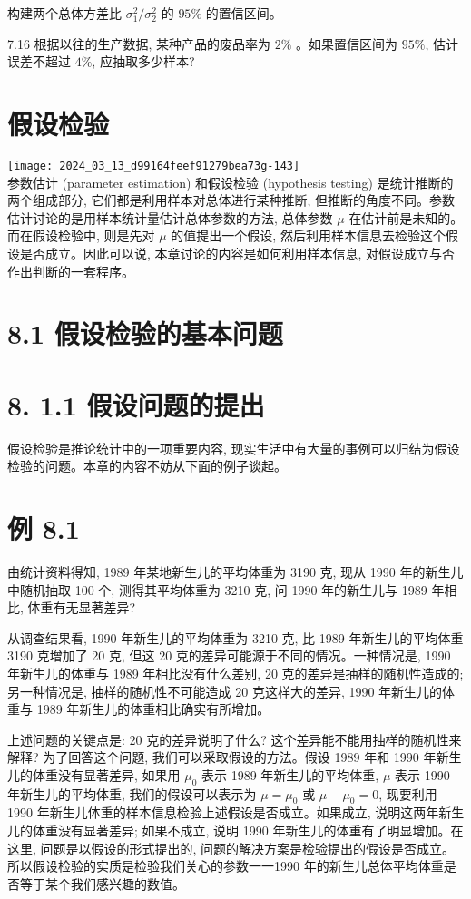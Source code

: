 \documentclass[10pt]{article}
\begin{document}
\begin{CJK*}{UTF8}{bsmi}
构建两个总体方差比 $\sigma_{1}^{2} / \sigma_{2}^{2}$ 的 $95 \%$ 的置信区间。

7.16 根据以往的生产数据, 某种产品的废品率为 $2 \%$ 。如果置信区间为 $95 \%$, 估计误差不超过 $4 \%$, 应抽取多少样本?

\section*{假设检验}
\texttt{[image: 2024\_03\_13\_d99164feef91279bea73g-143]}\\
参数估计 (parameter estimation) 和假设检验 (hypothesis testing) 是统计推断的两个组成部分, 它们都是利用样本对总体进行某种推断, 但推断的角度不同。参数估计讨论的是用样本统计量估计总体参数的方法, 总体参数 $\mu$ 在估计前是未知的。而在假设检验中, 则是先对 $\mu$ 的值提出一个假设, 然后利用样本信息去检验这个假设是否成立。因此可以说, 本章讨论的内容是如何利用样本信息, 对假设成立与否作出判断的一套程序。

\section*{8.1 假设检验的基本问题}
\section*{8. 1.1 假设问题的提出}
假设检验是推论统计中的一项重要内容, 现实生活中有大量的事例可以归结为假设检验的问题。本章的内容不妨从下面的例子谈起。

\section*{例 8.1}
由统计资料得知, 1989 年某地新生儿的平均体重为 3190 克, 现从 1990 年的新生儿中随机抽取 100 个, 测得其平均体重为 3210 克, 问 1990 年的新生儿与 1989 年相比, 体重有无显著差异?

从调查结果看, 1990 年新生儿的平均体重为 3210 克, 比 1989 年新生儿的平均体重 3190 克增加了 20 克, 但这 20 克的差异可能源于不同的情况。一种情况是, 1990 年新生儿的体重与 1989 年相比没有什么差别, 20 克的差异是抽样的随机性造成的; 另一种情况是, 抽样的随机性不可能造成 20 克这样大的差异, 1990 年新生儿的体重与 1989 年新生儿的体重相比确实有所增加。

上述问题的关键点是: 20 克的差异说明了什么? 这个差异能不能用抽样的随机性来解释? 为了回答这个问题, 我们可以采取假设的方法。假设 1989 年和 1990 年新生儿的体重没有显著差异, 如果用 $\mu_{0}$ 表示 1989 年新生儿的平均体重, $\mu$ 表示 1990 年新生儿的平均体重, 我们的假设可以表示为 $\mu=\mu_{0}$ 或 $\mu-\mu_{0}=0$, 现要利用 1990 年新生儿体重的样本信息检验上述假设是否成立。如果成立, 说明这两年新生儿的体重没有显著差异; 如果不成立, 说明 1990 年新生儿的体重有了明显增加。在这里, 问题是以假设的形式提出的, 问题的解决方案是检验提出的假设是否成立。所以假设检验的实质是检验我们关心的参数一一1990 年的新生儿总体平均体重是否等于某个我们感兴趣的数值。


\end{CJK*}
\end{document}
